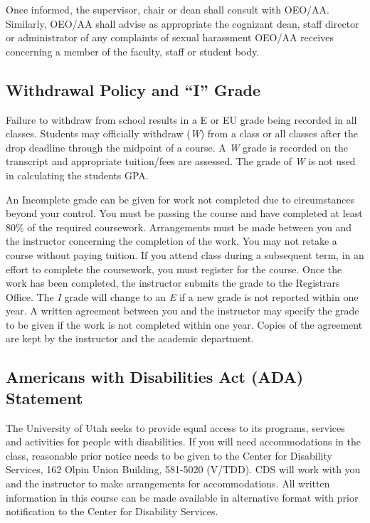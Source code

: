\documentclass[11pt,]{article}
\begin{document}
Once informed, the supervisor, chair or dean shall consult with OEO/AA.
Similarly, OEO/AA shall advise as appropriate the cognizant dean, staff
director or administrator of any complaints of sexual harassment OEO/AA
receives concerning a member of the faculty, staff or student body.

\hypertarget{withdrawal-policy-and-i-grade}{%
\subsection{Withdrawal Policy and ``I''
Grade}\label{withdrawal-policy-and-i-grade}}

Failure to withdraw from school results in a E or EU grade being
recorded in all classes. Students may officially withdraw (\emph{W})
from a class or all classes after the drop deadline through the midpoint
of a course. A \emph{W} grade is recorded on the transcript and
appropriate tuition/fees are assessed. The grade of \emph{W} is not used
in calculating the students GPA.

An Incomplete grade can be given for work not completed due to
circumstances beyond your control. You must be passing the course and
have completed at least 80\% of the required coursework. Arrangements
must be made between you and the instructor concerning the completion of
the work. You may not retake a course without paying tuition. If you
attend class during a subsequent term, in an effort to complete the
coursework, you must register for the course. Once the work has been
completed, the instructor submits the grade to the Registrars Office.
The \emph{I} grade will change to an \emph{E} if a new grade is not
reported within one year. A written agreement between you and the
instructor may specify the grade to be given if the work is not
completed within one year. Copies of the agreement are kept by the
instructor and the academic department.

\hypertarget{americans-with-disabilities-act-ada-statement}{%
\subsection{Americans with Disabilities Act (ADA)
Statement}\label{americans-with-disabilities-act-ada-statement}}

The University of Utah seeks to provide equal access to its programs,
services and activities for people with disabilities. If you will need
accommodations in the class, reasonable prior notice needs to be given
to the Center for Disability Services, 162 Olpin Union Building,
581-5020 (V/TDD). CDS will work with you and the instructor to make
arrangements for accommodations. All written information in this course
can be made available in alternative format with prior notification to
the Center for Disability Services.
\end{document}
